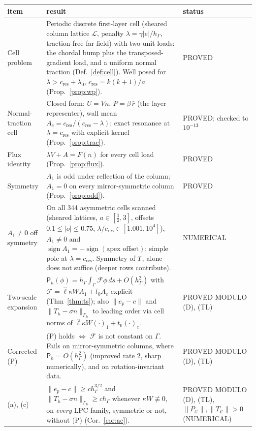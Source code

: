 \documentclass[11pt,reqno]{amsart}
\theoremstyle{plain}
\theoremstyle{definition}
\newcommand{\hG}{h_\Gamma}
\newcommand{\Gh}{\Gamma_h}
\newcommand{\norm}[1]{\lVert #1\rVert}
\newcommand{\Pm}{\mathsf P_h}
\newcommand{\Lc}{\mathcal L}
\newcommand{\Cc}{\mathcal C}
\newcommand{\cc}{c_{\mathrm{res}}}
\begin{document}
\begin{center}\footnotesize
\begin{tabular}{>{\raggedright\arraybackslash}p{}>{\raggedright\arraybackslash}p{}>{\raggedright\arraybackslash}p{}}
\toprule
item & result & status\\
\midrule
Cell problem & Periodic discrete first-layer cell (sheared column lattice $\Lc$, penalty $\lambda=\gamma|e|/\hG$, traction-free far field) with two unit loads: the chordal bump plus the transposed-gradient load, and a uniform normal traction (Def.~\ref{def:cell}). Well posed for $\lambda>\cc+\lambda_0$, $\cc=k(k+1)/a$ (Prop.~\ref{prop:wp}). & PROVED\\
Normal-traction cell & Closed form: $U=Vn$, $P=\beta\,\hat r$ (the layer representer), wall mean $A_c=\cc/(\cc-\lambda)$; exact resonance at $\lambda=\cc$ with explicit kernel (Prop.~\ref{prop:trac}). & PROVED; checked to $10^{-13}$\\
Flux identity & $\lambda V+A=F(n)$ for every cell load (Prop.~\ref{prop:flux}). & PROVED\\
Symmetry & $A_1$ is odd under reflection of the column; $A_1=0$ on every mirror-symmetric column (Prop.~\ref{prop:odd}). & PROVED\\
$A_1\ne0$ off symmetry & On all 344 asymmetric cells scanned (sheared lattices, $a\in[\frac12,3]$, offsets $0.1\le|o|\le0.75$, $\lambda/\cc\in[1.001,10^4]$), $A_1\ne0$ and $\operatorname{sign}A_1=-\operatorname{sign}(\text{apex offset})$; simple pole at $\lambda=\cc$. Symmetry of $T_e$ alone does not suffice (deeper rows contribute). & NUMERICAL\\
Two-scale expansion & $\Pm(\phi)=\hG\int_\Gamma\mathcal F\phi\,ds+O(\hG^2)$ with $\mathcal F=\hat\ell\kappa WA_1+\bar t_0A_c$ explicit (Thm~\ref{thm:ts}); also $\norm{e_p-c}$ and $\norm{T_h-\sigma n}_{\Gh}$ to leading order via cell norms of $\hat\ell\kappa W(\cdot)_1+\bar t_0(\cdot)_c$. & PROVED MODULO (D), (TL)\\
Corrected (P) & (P) holds $\iff$ $\mathcal F$ is not constant on $\Gamma$. Fails on mirror-symmetric columns, where $\Pm=O(\hG^2)$ (improved rate $2$, sharp numerically), and on rotation-invariant data. & PROVED MODULO (D), (TL)\\
(a), (c) & $\norm{e_p-c}\ge c\hG^{3/2}$ and $\norm{T_h-\sigma n}_{\Gh}\ge c\hG$ whenever $\kappa W\not\equiv0$, on \emph{every} LPC family, symmetric or not, without (P) (Cor.~\ref{cor:ac}). & PROVED MODULO (D), (TL), $\norm{P_{\Cc}},\norm{T_{\Cc}}>0$ (NUMERICAL)\\

\end{tabular}
\end{center}
\end{document}

